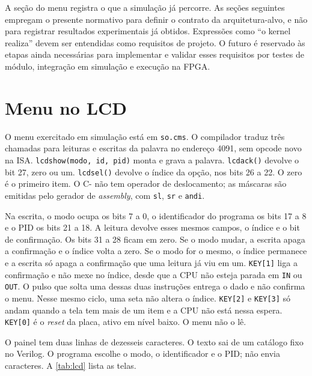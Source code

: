 \documentclass[
    12pt,
    openright,
    a4paper,
    english,
    brazilian
]{abntex2}
\begin{document}
A seção do menu registra o que a simulação já percorre. As seções seguintes empregam o presente normativo para definir o contrato da arquitetura-alvo, e não para registrar resultados experimentais já obtidos. Expressões como ``o kernel realiza'' devem ser entendidas como requisitos de projeto. O futuro é reservado às etapas ainda necessárias para implementar e validar esses requisitos por testes de módulo, integração em simulação e execução na FPGA.

\section{Menu no LCD}
\label{sec:menu-lcd}

O menu exercitado em simulação está em \texttt{so.cms}. O compilador traduz três chamadas para leituras e escritas da palavra no endereço 4091, sem opcode novo na ISA. \texttt{lcdshow(modo, id, pid)} monta e grava a palavra. \texttt{lcdack()} devolve o bit 27, zero ou um. \texttt{lcdsel()} devolve o índice da opção, nos bits 26 a 22. O zero é o primeiro item. O C- não tem operador de deslocamento; as máscaras são emitidas pelo gerador de \emph{assembly}, com \texttt{sl}, \texttt{sr} e \texttt{andi}.

Na escrita, o modo ocupa os bits 7 a 0, o identificador do programa os bits 17 a 8 e o PID os bits 21 a 18. A leitura devolve esses mesmos campos, o índice e o bit de confirmação. Os bits 31 a 28 ficam em zero. Se o modo mudar, a escrita apaga a confirmação e o índice volta a zero. Se o modo for o mesmo, o índice permanece e a escrita só apaga a confirmação que uma leitura já viu em um. \texttt{KEY[1]} liga a confirmação e não mexe no índice, desde que a CPU não esteja parada em \texttt{IN} ou \texttt{OUT}. O pulso que solta uma dessas duas instruções entrega o dado e não confirma o menu. Nesse mesmo ciclo, uma seta não altera o índice. \texttt{KEY[2]} e \texttt{KEY[3]} só andam quando a tela tem mais de um item e a CPU não está nessa espera. \texttt{KEY[0]} é o \emph{reset} da placa, ativo em nível baixo. O menu não o lê.

O painel tem duas linhas de dezesseis caracteres. O texto sai de um catálogo fixo no Verilog. O programa escolhe o modo, o identificador e o PID; não envia caracteres. A \autoref{tab:lcd} lista as telas.
\end{document}

